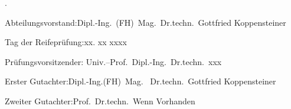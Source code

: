 \begin{titlepage}
	{\color{white}.}
	\bigskip
	\vspace{14cm}
	\noindent%

	Abteilungsvorstand:\hfill Dipl.-Ing.~(FH)\ Mag.\ Dr.techn.\ Gottfried Koppensteiner\\
	\bigskip
	\bigskip

	Tag der Reifeprüfung:\hfill xx. xx xxxx\\
	\bigskip
	\bigskip

	Prüfungsvorsitzender:\hfill
	Univ.--Prof.~Dipl.-Ing.~Dr.techn.~xxx\\
	\smallskip

	Erster Gutachter:\hfill Dipl.-Ing.(FH)\ Mag. \ Dr.techn.\ Gottfried Koppensteiner\\
	\smallskip

	Zweiter Gutachter:\hfill 	Prof.\ Dr.techn.\ Wenn Vorhanden\\
		\smallskip
\end{titlepage}
